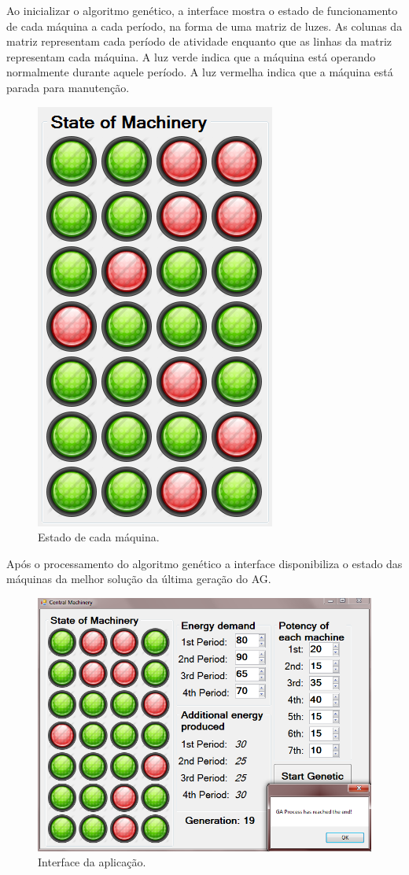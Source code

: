 \documentclass[twoside]{article}
\begin{document}
\begin{multicols}{2}
Ao inicializar o algoritmo genético, a interface mostra o estado de funcionamento de cada máquina a cada período, na forma de uma matriz de luzes. As colunas da matriz representam cada período de atividade enquanto que as linhas da matriz representam cada máquina.  A luz verde indica que a máquina está operando normalmente durante aquele período. A luz vermelha indica que a máquina está parada para manutenção.
\begin{figure}[H]
\label{fig:interface_machinestate}
  \caption{Estado de cada máquina.}
  \centering
    \includegraphics[scale = 0.6]{interface_machinestate.png}
\end{figure}

Após o processamento do algoritmo genético a interface disponibiliza o estado das máquinas da melhor solução da última geração do AG.
\begin{figure}[H]
\label{fig:interface_ga}
  \caption{Interface da aplicação.}
  \centering
    \includegraphics[scale = 0.35]{interface_ga.png}
\end{figure}



\end{multicols}
\end{document}
